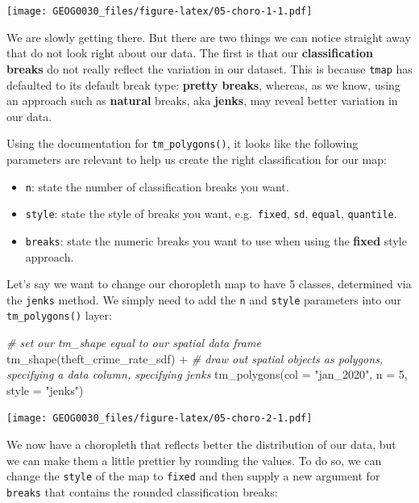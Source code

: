 \documentclass[
]{book}
\newenvironment{Shaded}{\begin{snugshade}}{\end{snugshade}}
\newcommand{\AttributeTok}[1]{\textcolor[rgb]{0.77,0.63,0.00}{#1}}
\newcommand{\CommentTok}[1]{\textcolor[rgb]{0.56,0.35,0.01}{\textit{#1}}}
\newcommand{\DecValTok}[1]{\textcolor[rgb]{0.00,0.00,0.81}{#1}}
\newcommand{\FunctionTok}[1]{\textcolor[rgb]{0.00,0.00,0.00}{#1}}
\newcommand{\NormalTok}[1]{#1}
\newcommand{\SpecialCharTok}[1]{\textcolor[rgb]{0.00,0.00,0.00}{#1}}
\newcommand{\StringTok}[1]{\textcolor[rgb]{0.31,0.60,0.02}{#1}}
\providecommand{\tightlist}{%
  \setlength{\itemsep}{0pt}\setlength{\parskip}{0pt}}
\begin{document}
\texttt{[image: GEOG0030\_files/figure-latex/05-choro-1-1.pdf]}

We are slowly getting there. But there are two things we can notice straight away that do not look right about our data. The first is that our \textbf{classification breaks} do not really reflect the variation in our dataset. This is because \texttt{tmap} has defaulted to its default break type: \textbf{pretty breaks}, whereas, as we know, using an approach such as \textbf{natural} breaks, aka \textbf{jenks}, may reveal better variation in our data.

Using the documentation for \texttt{tm\_polygons()}, it looks like the following parameters are relevant to help us create the right classification for our map:

\begin{itemize}
\tightlist
\item
  \texttt{n}: state the number of classification breaks you want.
\item
  \texttt{style}: state the style of breaks you want, e.g.~\texttt{fixed}, \texttt{sd}, \texttt{equal}, \texttt{quantile}.
\item
  \texttt{breaks}: state the numeric breaks you want to use when using the \textbf{fixed} style approach.
\end{itemize}

Let's say we want to change our choropleth map to have 5 classes, determined via the \texttt{jenks} method. We simply need to add the \texttt{n} and \texttt{style} parameters into our \texttt{tm\_polygons()} layer:

\begin{Shaded}
\begin{Highlighting}[]
\CommentTok{\# set our tm\_shape equal to our spatial data frame}
\FunctionTok{tm\_shape}\NormalTok{(theft\_crime\_rate\_sdf) }\SpecialCharTok{+}
  \CommentTok{\# draw out spatial objects as polygons, specifying a data column, specifying jenks}
  \FunctionTok{tm\_polygons}\NormalTok{(}\AttributeTok{col =} \StringTok{"jan\_2020"}\NormalTok{, }\AttributeTok{n =} \DecValTok{5}\NormalTok{, }\AttributeTok{style =} \StringTok{"jenks"}\NormalTok{)}
\end{Highlighting}
\end{Shaded}

\texttt{[image: GEOG0030\_files/figure-latex/05-choro-2-1.pdf]}

We now have a choropleth that reflects better the distribution of our data, but we can make them a little prettier by rounding the values. To do so, we can change the \texttt{style} of the map to \texttt{fixed} and then supply a new argument for \texttt{breaks} that contains the rounded classification breaks:
\end{document}
